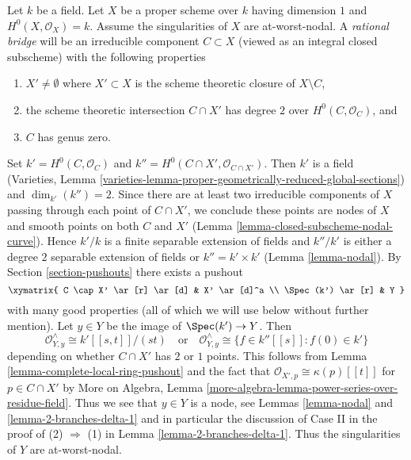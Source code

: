 \begin{example}
\label{example-rational-bridge}
Let $k$ be a field. Let $X$ be a proper scheme over $k$ having dimension $1$
and $H^0(X, \mathcal{O}_X) = k$. Assume the singularities of $X$ are
at-worst-nodal.
A {\it rational bridge} will be an irreducible component $C \subset X$
(viewed as an integral closed subscheme) with the following properties
\begin{enumerate}
\item $X' \not = \emptyset$ where $X' \subset X$ is the scheme theoretic closure
of $X \setminus C$,
\item the scheme theoretic intersection $C \cap X'$
has degree $2$ over $H^0(C, \mathcal{O}_C)$, and
\item $C$ has genus zero.
\end{enumerate}
Set $k' = H^0(C, \mathcal{O}_C)$ and
$k'' = H^0(C \cap X', \mathcal{O}_{C \cap X'})$.
Then $k'$ is a field (Varieties, Lemma
\ref{varieties-lemma-proper-geometrically-reduced-global-sections})
and $\dim_{k'}(k'') = 2$. Since there are at least
two irreducible components of $X$ passing through
each point of $C \cap X'$, we conclude these points are nodes of $X$
and smooth points on both $C$ and $X'$
(Lemma \ref{lemma-closed-subscheme-nodal-curve}).
Hence $k'/k$ is a finite separable extension of fields
and $k''/k'$ is either a degree $2$ separable extension of fields
or $k'' = k' \times k'$ (Lemma \ref{lemma-nodal}). By
Section \ref{section-pushouts} there exists a pushout
$$
\xymatrix{
C \cap X' \ar[r] \ar[d] &
X' \ar[d]^a \\
\Spec(k') \ar[r] &
Y
}
$$
with many good properties (all of which we will use below without
further mention). Let $y \in Y$ be the image of $\Spec(k') \to Y$.
Then
$$
\mathcal{O}_{Y, y}^\wedge \cong k'[[s, t]]/(st)
\quad\text{or}\quad
\mathcal{O}_{Y, y}^\wedge \cong
\{f \in k''[[s]] : f(0) \in k'\}
$$
depending on whether $C \cap X'$ has $2$ or $1$ points.
This follows from Lemma \ref{lemma-complete-local-ring-pushout}
and the fact that $\mathcal{O}_{X', p} \cong \kappa(p)[[t]]$
for $p \in C \cap X'$ by More on Algebra, Lemma
\ref{more-algebra-lemma-power-series-over-residue-field}.
Thus we see that $y \in Y$ is a node, see Lemmas \ref{lemma-nodal}
and \ref{lemma-2-branches-delta-1} and in particular the discussion
of Case II in the proof of (2) $\Rightarrow$ (1) in
Lemma \ref{lemma-2-branches-delta-1}.
Thus the singularities of $Y$ are at-worst-nodal.


\end{example}
